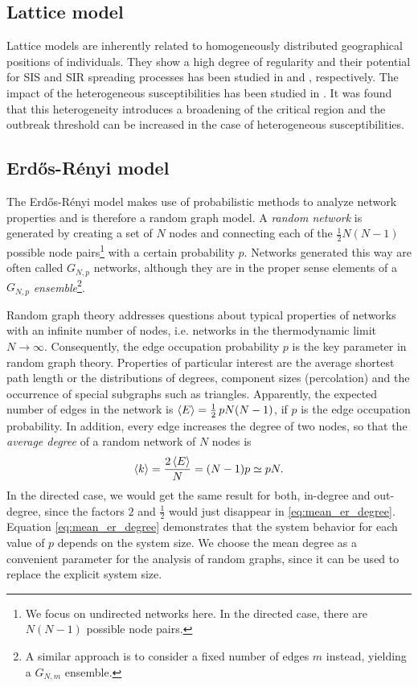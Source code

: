 \subsection{Lattice model}
Lattice models are inherently related to homogeneously distributed geographical positions of individuals.
They show a high degree of regularity and their potential for SIS and SIR spreading processes has been studied in \citep{Harris:1974} and \citep{Bak:1990}, respectively.
The impact of the heterogeneous susceptibilities has been studied in \citep{Sander2002293}.
It was found that this heterogeneity introduces a broadening of the critical region and the outbreak threshold can be increased in the case of heterogeneous susceptibilities.


\subsection{Erd\H{o}s-R\'enyi model}\label{sec:er_model}
The Erd\H{o}s-R\'enyi model makes use of probabilistic methods to analyze network properties and is therefore a random graph model.
A \emph{random network} is generated by creating a set of $N$ nodes and connecting each of the $\frac{1}{2}N(N-1)$ possible node pairs\footnote{We focus on undirected networks here. In the directed case, there are $N(N-1)$ possible node pairs.} with a certain probability $p$.
Networks generated this way are often called $G_{N,p}$ networks, although they are in the proper sense elements of a $G_{N,p}$ \emph{ensemble}\footnote{A similar approach is to consider a fixed number of edges $m$ instead, yielding a $G_{N,m}$ ensemble.}.

Random graph theory addresses questions about typical properties of networks with an infinite number of nodes, i.e. networks in the thermodynamic limit $N\rightarrow \infty $.
Consequently, the edge occupation probability $p$ is the key parameter in random graph theory.
Properties of particular interest are the average shortest path length or the distributions of degrees, component sizes (percolation) and the occurrence of special subgraphs such as triangles.
Apparently, the expected number of edges in the network is $\left< E \right>=\frac{1}{2} \, pN(N-1)$, if $p$ is the edge occupation probability.
In addition, every edge increases the degree of two nodes, so that the \emph{average degree} of a random network of $N$ nodes is
\begin{equation}\label{eq:mean_er_degree}
\left< k \right>=\frac{2\left< E \right>}{N}=(N-1)p\simeq pN .
\end{equation}
In the directed case, we would get the same result for both, in-degree and out-degree, since the factors $2$ and $\frac{1}{2}$ would just disappear in \eqref{eq:mean_er_degree}.
Equation \eqref{eq:mean_er_degree} demonstrates that the system behavior for each value of $p$ depends on the system size.
We choose the mean degree as a convenient parameter for the analysis of random graphs, since it can be used to replace the explicit system size.

